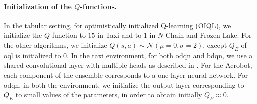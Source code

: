 % 	
\paragraph{Initialization of the $Q$-functions.} In the tabular setting, for optimistically initialized Q-learning (OIQL), we initialize the $Q$-function to $15$ in Taxi and to $1$ in $N$-Chain and Frozen Lake. For the other algorithms, we initialize $Q(s,a) \sim \mathcal{N}(\mu=0,\sigma=2)$, except $Q_E$ of \gls{oql} is initialized to $0$.
In the taxi environment, for both \gls{odqn} and \gls{bdqn}, we use a shared convolutional layer with multiple heads as described in \cite{osband2016deep}. For the Acrobot, each component of the ensemble corresponds to a one-layer neural network. For \gls{odqn}, in both the environment, we initialize the output layer corresponding to $Q_E$ to small values of the parameters, in order to obtain initially $Q_E \approx 0$. 


